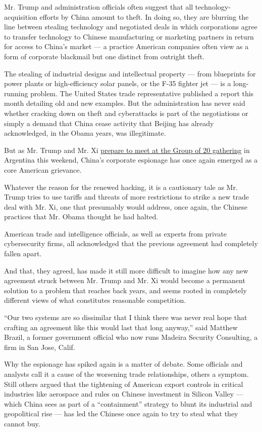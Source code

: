 Mr. Trump and administration officials often suggest that all
technology-acquisition efforts by China amount to theft. In doing so,
they are blurring the line between stealing technology and negotiated
deals in which corporations agree to transfer technology to Chinese
manufacturing or marketing partners in return for access to China's
market --- a practice American companies often view as a form of
corporate blackmail but one distinct from outright theft.

The stealing of industrial designs and intellectual property --- from
blueprints for power plants or high-efficiency solar panels, or the F-35
fighter jet --- is a long-running problem. The United States trade
representative published a report this month detailing old and new
examples. But the administration has never said whether cracking down on
theft and cyberattacks is part of the negotiations or simply a demand
that China cease activity that Beijing has already acknowledged, in the
Obama years, was illegitimate.

But as Mr. Trump and Mr. Xi
\href{https://www.nytimes.com/2018/11/27/us/politics/trump-xi-trade-g-20.html}{prepare
to meet at the Group of 20 gathering} in Argentina this weekend, China's
corporate espionage has once again emerged as a core American grievance.

Whatever the reason for the renewed hacking, it is a cautionary tale as
Mr. Trump tries to use tariffs and threats of more restrictions to
strike a new trade deal with Mr. Xi, one that presumably would address,
once again, the Chinese practices that Mr. Obama thought he had halted.

American trade and intelligence officials, as well as experts from
private cybersecurity firms, all acknowledged that the previous
agreement had completely fallen apart.

And that, they agreed, has made it still more difficult to imagine how
any new agreement struck between Mr. Trump and Mr. Xi would become a
permanent solution to a problem that reaches back years, and seems
rooted in completely different views of what constitutes reasonable
competition.

``Our two systems are so dissimilar that I think there was never real
hope that crafting an agreement like this would last that long anyway,''
said Matthew Brazil, a former government official who now runs Madeira
Security Consulting, a firm in San Jose, Calif.

Why the espionage has spiked again is a matter of debate. Some officials
and analysts call it a cause of the worsening trade relationships,
others a symptom. Still others argued that the tightening of American
export controls in critical industries like aerospace and rules on
Chinese investment in Silicon Valley --- which China sees as part of a
``containment'' strategy to blunt its industrial and geopolitical rise
--- has led the Chinese once again to try to steal what they cannot buy.

